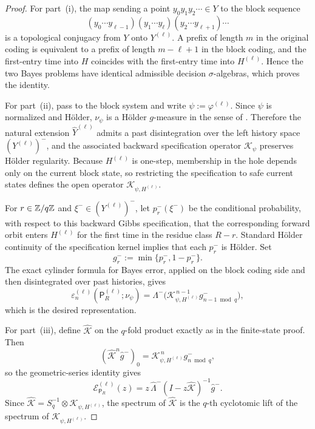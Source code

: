 \begin{proof}
For part~(i), the map sending a point
\(y_0y_1y_2\cdots\in Y\) to the block sequence
\[
  (y_0\cdots y_{\ell-1})(y_1\cdots y_\ell)(y_2\cdots y_{\ell+1})\cdots
\]
is a topological conjugacy from \(Y\) onto \(Y^{(\ell)}\).  A prefix of
length \(m\) in the original coding is equivalent to a prefix of length
\(m-\ell+1\) in the block coding, and the first-entry time into \(H\)
coincides with the first-entry time into \(H^{(\ell)}\).  Hence the two
Bayes problems have identical admissible decision \(\sigma\)-algebras,
which proves the identity.

For part~(ii), pass to the block system and write
\(\psi:=\varphi^{(\ell)}\).  Since \(\psi\) is normalized and H\"older,
\(\nu_\psi\) is a H\"older \(g\)-measure in the sense of
\citet{Walters1975GMeasures}.  Therefore the natural extension
\(\widehat Y^{(\ell)}\) admits a past disintegration over the left
history space \((Y^{(\ell)})^{-}\), and the associated backward
specification operator \(\mathcal K_\psi\) preserves H\"older
regularity.  Because \(H^{(\ell)}\) is one-step, membership in the hole
depends only on the current block state, so restricting the
specification to safe current states defines the open operator
\(\mathcal K_{\psi,H^{(\ell)}}\).

For \(r\in\mathbb{Z}/q\mathbb{Z}\) and \(\xi^-\in (Y^{(\ell)})^{-}\), let
\(p_r^-(\xi^-)\) be the conditional probability, with respect to this
backward Gibbs specification, that the corresponding forward orbit
enters \(H^{(\ell)}\) for the first time in the residue class
\(R-r\).  Standard H\"older continuity of the specification kernel
implies that each \(p_r^-\) is H\"older.  Set
\[
  g_r^-:=\min\{p_r^-,1-p_r^-\}.
\]
The exact cylinder formula for Bayes error, applied on the block coding
side and then disintegrated over past histories, gives
\[
  \varepsilon_n^{(\ell)}
  (\mathsf P_R^{(\ell)};\nu_\psi)
  =
  \Lambda^-\bigl(
    \mathcal K_{\psi,H^{(\ell)}}^{\,n-1}g_{n-1\bmod q}^-
  \bigr),
\]
which is the desired representation.

For part~(iii), define \(\widehat{\mathcal K}\) on the \(q\)-fold
product exactly as in the finite-state proof.  Then
\[
  (\widehat{\mathcal K}^n\widehat g^-)_0
  = \mathcal K_{\psi,H^{(\ell)}}^{\,n}g_{n\bmod q}^-,
\]
so the geometric-series identity gives
\[
  \mathcal E_{\mathsf P_R}^{(\ell)}(z)
  = z\,\widehat\Lambda^-
      (I-z\widehat{\mathcal K})^{-1}\widehat g^-.
\]
Since \(\widehat{\mathcal K}=S_q^{-1}\otimes
\mathcal K_{\psi,H^{(\ell)}}\), the spectrum of \(\widehat{\mathcal K}\)
is the \(q\)-th cyclotomic lift of the spectrum of
\(\mathcal K_{\psi,H^{(\ell)}}\).


\end{proof}
